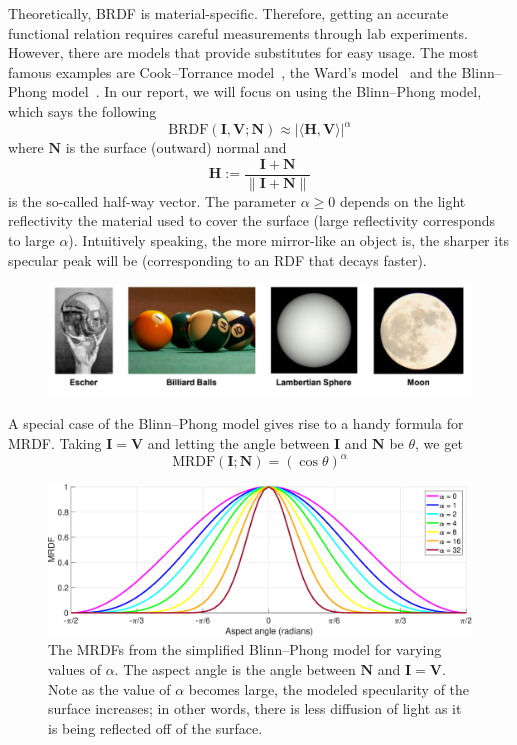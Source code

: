 \documentclass[11pt]{amsart}
\newcommand{\BRDF}{\mathrm{BRDF}}
\newcommand{\MRDF}{\mathrm{MRDF}}
\newcommand{\ip}[2]{\langle {#1}, {#2} \rangle}
\theoremstyle{definition}
\begin{document}
Theoretically, BRDF is material-specific. Therefore, getting an accurate functional
relation requires careful measurements through lab experiments. However, there
are models that provide substitutes for easy usage. The most famous examples
are Cook--Torrance model~\cite{CookTorr}, the Ward's model~\cite{Ward} and the
Blinn--Phong model~\cite{BlinnPhong}. In our report, we will focus on using the
Blinn--Phong model, which says the following
\[
   \BRDF(\mathbf{I},\mathbf{V};\mathbf{N})
   \approx
   |\ip{\mathbf{H}}{\mathbf{V}}|^\alpha
\]
where $\mathbf{N}$ is the surface (outward) normal and $$\mathbf{H}:=\frac{\mathbf{I}+\mathbf{N}} {\|\mathbf{I}+\mathbf{N}\|}$$
is the so-called half-way vector. The parameter $\alpha \geq 0$ depends on the light reflectivity the material used to cover the surface (large reflectivity corresponds to large $\alpha$). Intuitively speaking, the more mirror-like an object is,  the sharper its specular peak will be (corresponding to an RDF that decays faster). 

\begin{figure}[H]
 \includegraphics[width=1.1\textwidth]{./figs/Surfaces.pdf}
\end{figure}

A special case of the Blinn--Phong model gives rise to a handy formula for MRDF. Taking $\mathbf{I}=\mathbf{V}$ and letting the angle between $\mathbf{I}$ and $\mathbf{N}$ be $\theta$, we get
\[
\MRDF(\mathbf{I};\mathbf{N})=(\cos \theta)^\alpha
\]

\begin{figure}[H]
 \includegraphics[width=1\textwidth]{./figs/MRDFs.eps}
 \caption{The MRDFs from the simplified Blinn--Phong model for varying values of $\alpha$. The aspect angle is the angle between $\mathbf{N}$ and $\mathbf{I}=\mathbf{V}$. Note as the value of $\alpha$ becomes large, the modeled specularity of the surface increases; in other words, there is less diffusion of light as it is being reflected off of the surface.}
 \label{MRDFs}
\end{figure}
\end{document}

